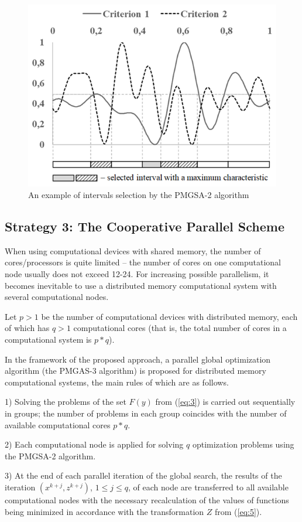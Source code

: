 \documentclass[review]{elsarticle}
\begin{document}
\begin{figure}
  \centering
  \includegraphics[width=0.7\linewidth]{fig3}
  \caption{An example of intervals selection by the PMGSA-2 algorithm}
  \label{fig:3}
\end{figure}

\subsection{Strategy 3: The Cooperative Parallel Scheme} \label{subsec:3}

When using computational devices with shared memory, the number of {cores/processors} is quite limited -- the number of cores on one computational node usually does not exceed 12-24. For increasing possible parallelism, it becomes inevitable to use a distributed memory computational system with several computational nodes.

Let $p>1$ be the number of computational devices with distributed memory, each of which has $q>1$ computational cores (that is, the total number of cores in a computational system is $p*q$). 

In the framework of the proposed approach, a parallel global optimization algorithm (the PMGAS-3 algorithm) is proposed for distributed memory computational systems, the main rules of which are as follows.


1) Solving the problems of the set $F(y)$ from (\ref{eq:3}) is carried out sequentially in groups; the number of problems in each group coincides with the number of available computational cores $p*q$.

2) Each computational node is applied for solving $q$ optimization problems using the PMGSA-2 algorithm.

3) At the end of each parallel iteration of the global search, the results of the iteration $(x^{k+j},z^{k+j} )$, $1 \leq j \leq q$, of each node are transferred to all available computational nodes with the necessary recalculation of the values of functions being minimized in accordance with the transformation $Z$ from (\ref{eq:5}).
\end{document}

